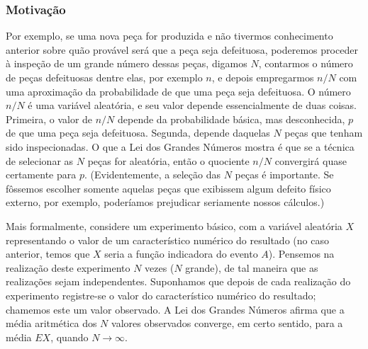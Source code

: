\begin{frame}
\frametitle{\textbf{Motivação}}
\baselineskip=13pt
\begin{block}{}


Por exemplo, se uma nova peça for produzida e não tivermos
conhecimento anterior sobre quão provável será que a peça seja
defeituosa, poderemos proceder à inspeção de um grande número dessas
peças, digamos $N$, contarmos o número de peças defeituosas dentre
elas, por exemplo $n$, e depois empregarmos $n/N$ com uma
aproximação da probabilidade de que uma peça seja defeituosa. O
número $n/N$ é uma variável aleatória, e seu valor depende
essencialmente de duas coisas. Primeira, o valor de $n/N$ depende da
probabilidade básica, mas desconhecida, $p$ de que uma peça seja
defeituosa. Segunda, depende daquelas $N$ peças que tenham sido
inspecionadas. O que a Lei dos Grandes Números mostra é que se a
técnica de selecionar as $N$ peças for aleatória, então o quociente
$n/N$ convergirá quase certamente para $p$. (Evidentemente, a
seleção das $N$ peças é importante. Se fôssemos escolher somente
aquelas peças que exibissem algum defeito físico externo, por
exemplo, poderíamos prejudicar seriamente nossos cálculos.) \\ \bigskip

Mais formalmente, considere um experimento básico, com a variável
aleatória $X$ representando o valor de um característico numérico do
resultado (no caso anterior, temos que $X$ seria a função indicadora
do evento $A$). Pensemos na realização deste experimento $N$ vezes
($N$ grande), de tal maneira que as realizações sejam independentes.
Suponhamos que depois de cada realização do experimento registre-se
o valor do característico numérico do resultado; chamemos este um
valor observado. A Lei dos Grandes Números afirma que a média
aritmética dos $N$ valores observados converge, em certo sentido,
para a média $EX$, quando $N\rightarrow \infty$.


\end{block}
\end{frame}


%
%
%
%


